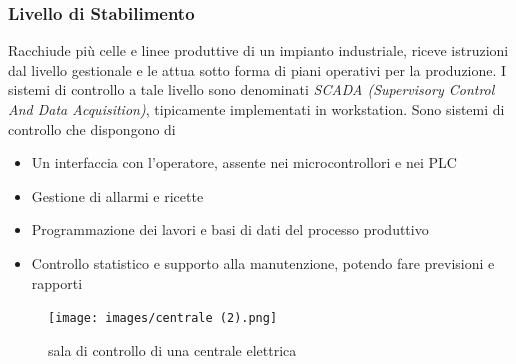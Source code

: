 \documentclass[10pt, letterpaper]{report}
\begin{document}
\subsubsection{Livello di Stabilimento}
Racchiude più celle e linee produttive di un impianto industriale, riceve istruzioni dal livello gestionale e le 
attua sotto forma di piani operativi per la produzione. I sistemi di controllo a tale livello sono denominati 
\textit{SCADA (Supervisory Control And Data Acquisition)}, tipicamente implementati in workstation. Sono sistemi di 
controllo che dispongono di\begin{itemize}
    \item Un interfaccia con l'operatore, assente nei microcontrollori e nei PLC 
    \item Gestione di allarmi e ricette 
    \item Programmazione dei lavori e basi di dati del processo produttivo 
    \item Controllo statistico e supporto alla manutenzione, potendo fare previsioni e rapporti
\end{itemize}
\begin{figure}[h!]
    \centering
    \texttt{[image: images/centrale (2).png]}
    \caption{sala di controllo di una centrale elettrica}
\end{figure}
\end{document}
